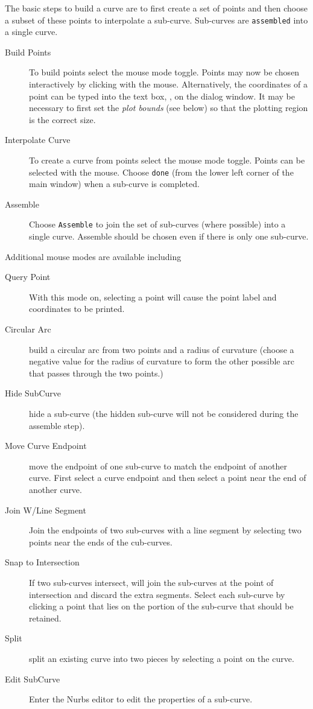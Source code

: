 The basic steps to build a curve are to first create a set of points and then choose a 
subset of these points to interpolate a sub-curve. Sub-curves are {\tt assembled} into
a single curve.
\begin{description}
  \item[Build Points] To build points select the  mouse mode toggle. Points may now
    be chosen interactively by clicking with the mouse. Alternatively, the coordinates of a 
    point can be typed into the text box, , on the dialog window.
    It may be necessary to first set the {\em plot bounds} (see below) so that the plotting region is the correct size.
  \item[Interpolate Curve] To create a curve from points select the  mouse
         mode toggle. Points can be selected with the mouse. Choose {\tt done} (from the lower
         left corner of the main window) when a sub-curve is completed.
  \item[Assemble] Choose {\tt Assemble} to join the set of sub-curves (where possible) into a
         single curve. Assemble should be chosen even if there is only one sub-curve.
\end{description}

Additional mouse modes are available including
\begin{description}
  \item[Query Point] With this mode on, selecting a point will cause the point label and coordinates
     to be printed.
  \item[Circular Arc] build a circular arc from two points and a radius of curvature 
      (choose a negative value for the radius of curvature 
      to form the other possible arc that passes through the two points.)
  \item[Hide SubCurve] hide a sub-curve (the hidden sub-curve will not be considered during the
      assemble step).
  \item[Move Curve Endpoint] move the endpoint of one sub-curve to match the endpoint of another
         curve. First select a curve endpoint and then select a point near the end of another curve.
  \item[Join W/Line Segment]  Join the endpoints of two sub-curves with a line segment by selecting
           two points near the ends of the cub-curves.
  \item[Snap to Intersection] If two sub-curves intersect,  will 
             join the sub-curves at the point of intersection and discard the extra segments. Select each sub-curve
             by clicking a point that lies on the portion of the sub-curve that should be retained.
  \item[Split] split an existing curve into two pieces by selecting a point on the curve.
  \item[Edit SubCurve] Enter the Nurbs editor to edit the properties of a sub-curve.
\end{description}


